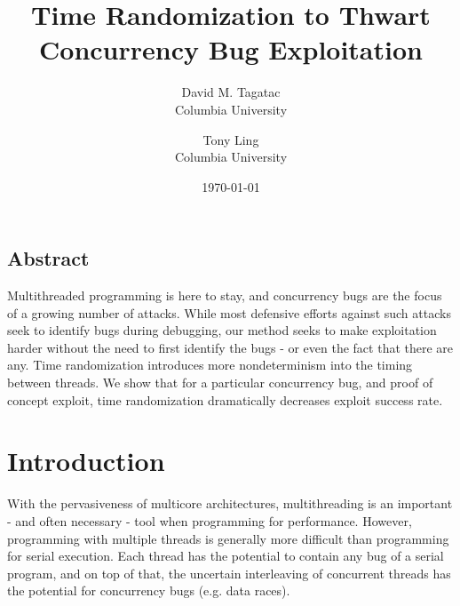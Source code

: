 \documentclass[letterpaper,twocolumn,10pt]{article}
\begin{document}
\date{\today}

\title{\Large \bf Time Randomization to Thwart Concurrency Bug Exploitation}

\author{
{\rm David M. Tagatac}\\
Columbia University
\and
{\rm Tony Ling}\\
Columbia University
} %

\maketitle

\subsection*{Abstract}
Multithreaded programming is here to stay, and concurrency bugs are the focus of a growing number of attacks.  While most defensive efforts against such attacks seek to identify bugs during debugging, our method seeks to make exploitation harder without the need to first identify the bugs - or even the fact that there are any.  Time randomization introduces more nondeterminism into the timing between threads.  We show that for a particular concurrency bug, and proof of concept exploit, time randomization dramatically decreases exploit success rate.

\section{Introduction}
With the pervasiveness of multicore architectures, multithreading is an important - and often necessary - tool when programming for performance.  However, programming with multiple threads is generally more difficult than programming for serial execution.  Each thread has the potential to contain any bug of a serial program, and on top of that, the uncertain interleaving of concurrent threads has the potential for concurrency bugs (e.g. data races).
\end{document}
